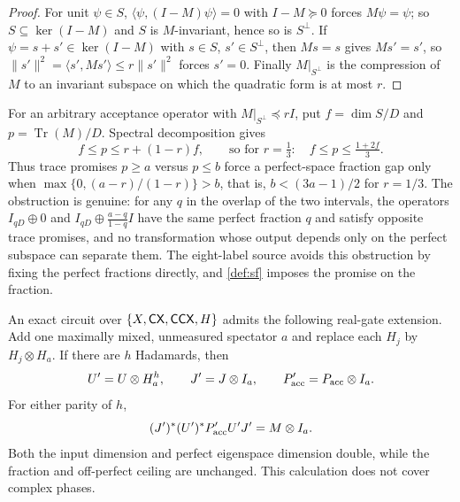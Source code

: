 \begin{proof}
For unit \(\psi\in S\), \(\langle\psi,(I-M)\psi\rangle=0\) with \(I-M\succeq0\)
forces \(M\psi=\psi\); so \(S\subseteq\ker(I-M)\) and \(S\) is \(M\)-invariant,
hence so is \(S^\perp\).  If \(\psi=s+s'\in\ker(I-M)\) with \(s\in S\),
\(s'\in S^\perp\), then \(Ms=s\) gives \(Ms'=s'\), so
\(\|s'\|^2=\langle s',Ms'\rangle\le r\|s'\|^2\) forces \(s'=0\).  Finally
\(M|_{S^\perp}\) is the compression of \(M\) to an invariant subspace on which
the quadratic form is at most \(r\).
\end{proof}

For an arbitrary acceptance operator with
\(M|_{S^\perp}\preceq rI\), put \(f=\dim S/D\) and
\(p=\operatorname{Tr}(M)/D\).  Spectral decomposition gives
\[
f\le p\le r+(1-r)f,
\qquad\text{so for }r=\tfrac13:\quad f\le p\le\tfrac{1+2f}{3}.
\]
Thus trace promises \(p\ge a\) versus \(p\le b\) force a perfect-space
fraction gap only when
\(\max\{0,(a-r)/(1-r)\}>b\), that is, \(b<(3a-1)/2\) for \(r=1/3\).  The
obstruction is genuine: for any \(q\) in the overlap of the two intervals,
the operators \(I_{qD}\oplus0\) and \(I_{qD}\oplus\frac{a-q}{1-q}I\) have the
same perfect fraction \(q\) and satisfy opposite trace promises, and no
transformation whose output depends only on the perfect subspace can
separate them.  The eight-label source avoids this obstruction by fixing the
perfect fractions directly, and \cref{def:sf} imposes the promise on the
fraction.

An exact circuit over \(\{X,\mathsf{CX},\mathsf{CCX},H\}\) admits the following real-gate
extension.  Add one maximally mixed, unmeasured spectator \(a\) and replace
each \(H_j\) by \(H_j\otimes H_a\).  If there are \(h\) Hadamards, then
\[
U'=U\otimes H_a^h,\qquad J'=J\otimes I_a,\qquad
P'_{\rm acc}=P_{\rm acc}\otimes I_a.
\]
For either parity of \(h\),
\[
(J')^*(U')^*P'_{\rm acc}U'J'=M\otimes I_a.
\]
Both the input dimension and perfect eigenspace dimension double, while the
fraction and off-perfect ceiling are unchanged.  This calculation does not
cover complex phases.
